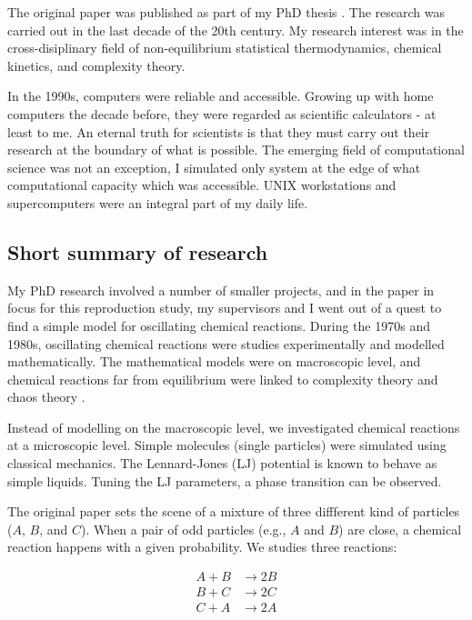 The original paper \supercite{Geisshirt:1997} was published as part of my
PhD thesis \supercite{Geisshirt:PhD}. The research was carried out in the
last decade of the 20th century. My research interest was in the cross-disiplinary
field of non-equilibrium statistical thermodynamics, chemical kinetics, and
complexity theory.

In the 1990s, computers were reliable and accessible. Growing up with home computers
the decade before, they were regarded as scientific calculators - at least to me.
An eternal truth for scientists is that they must carry out their research at
the boundary of what is possible. The emerging field of computational science
was not an exception, I simulated only system at the edge of what computational capacity
which was accessible. UNIX workstations and supercomputers were an integral
part of my daily life.

\subsection{Short summary of research}

My PhD research involved a number of smaller projects, and in the paper in focus
for this reproduction study, my supervisors and I went out of a quest to
find a simple model for oscillating chemical reactions. During the 1970s and 1980s,
oscillating chemical reactions were studies experimentally and modelled
mathematically. The mathematical models were on macroscopic level, and
chemical reactions far from equilibrium were linked to complexity theory and
chaos theory \supercite{Kuramoto:1984} \supercite{Prigogine:1984} \supercite{Nicolis:1989}.

Instead of modelling on the macroscopic level, we investigated chemical reactions at
a microscopic level. Simple molecules (single particles) were simulated
using classical mechanics. The Lennard-Jones (LJ) potential is known to behave as
simple liquids. Tuning the LJ parameters, a phase transition can be observed.

The original paper sets the scene of a mixture of three diffferent kind of particles
($A$, $B$, and $C$). When a pair of odd particles (e.g., $A$ and $B$) are close,
a chemical reaction happens with a given probability. We studies three reactions:

\begin{eqnarray}
    A + B &\rightarrow 2B \\
    B + C &\rightarrow 2C \\
    C + A &\rightarrow 2A
\end{eqnarray}


